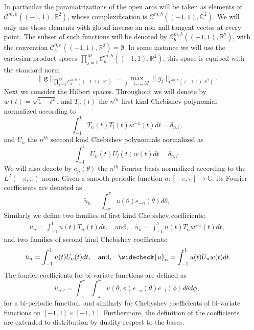 \documentclass{article}
\newcommand{\bg}{\bm{g}}
\newcommand{\IC}{{\mathbb C}}
\newcommand{\IR}{{\mathbb R}}
\newcommand{\cmspaceh}[4]{\mathcal{C}^{#1,#2} \left( #3, #4 \right)}
\newcommand{\rgeoh}[2]{\mathcal{C}_b^{#1,#2}\left( (-1,1), \IR^2 \right)}
\begin{document}
In particular the paramatrizations of the open arcs will be taken as elements of $\cmspaceh{m}{h}{(-1,1)}{\IR^2}$, whose complexification is $\cmspaceh{m}{h}{(-1,1)}{\IC^2}$. We will only use those elements with global inverse an non null tangent vector at every point. The subset of such functions will be denoted by $\rgeoh{m}{h}$, with the convention $\rgeoh{0}{h}  = \emptyset$.
In some instance we will use the cartesian product spaces $\prod_{j=1}^M \rgeoh{m}{h}$, this space is equiped with the standard norm
$$ \| \bg\|_{\prod_{j=1}^M \rgeoh{m}{h}}
 = \max_{j=1,\hdots,M} \| g_j\|_{\cmspaceh{m}{h}{(-1,1)}{\IR^2}}.
$$
Next we consider the Hilbert spaces. Throughout we will denote by $w(t) = \sqrt{1-t^2}$, and $T_n(t)$ the $n^{th}$ first kind Chebishev polynomial normalized according to $$\int_{-1}^1 T_n(t) T_l(t) w^{-1}(t) dt = \delta_{n,l},$$ and $U_n$ the $n^{th}$ seccond kind Chebishev polynomials normalized as 
$$\int_{-1}^1 U_n(t) U_l(t) w(t) dt = \delta_{n,l}.$$
 We will also denote by $e_n(\theta)$ the $n^{th}$ Fourier basis normalized according to the $L^2(-\pi,\pi)$ norm. 
Given a smooth periodic function $u :[-\pi,\pi] \rightarrow \IC$, its Fourier coefficients are denoted as
$$
\widetilde{u}_n = \int_{-\pi}^\pi u(\theta) e_{-n}(\theta) d\theta, 
$$
Similarly we define two families of first kind Chebishev coefficients:
\begin{align*}
u_n = \int_{-1}^{1} u(t) T_n(t) dt, \quad \text{and,} \quad  \widehat{u}_n = \int_{-1}^1 u(t) T_n w^{-1}(t)dt, 
\end{align*}
and two families of second kind Chebishev coefficients:
\begin{align*}
\ddot{u}_n = \int_{-1}^1 u(t) U_n (t) dt,\quad \text{and,}\quad \widecheck{u} _n = \int_{-1}^1 u(t) U_n w(t) dt
\end{align*}
The fourier coefficients for bi-variate functions are defined as
$$\widetilde{u}_{n,l} = \int_{-\pi}^{\pi}\int_{-\pi}^\pi u(\theta,\phi) e_{-n}(\theta)e_{-l}(\phi) d\theta d\phi,$$
for a bi-periodic function, and similarly  for Chebyshev coefficients of  bi-variate functions on $[-1,1]\times[-1,1]$. Furthermore, the definition of the coefficients are extended to distribution by duality respect to the bases. 
\end{document}
